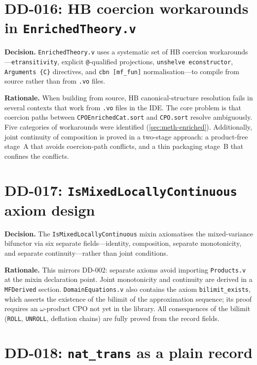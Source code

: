 \section*{DD-016: HB coercion workarounds in \texttt{EnrichedTheory.v}}

\textbf{Decision.}
\texttt{EnrichedTheory.v} uses a systematic set of HB coercion
workarounds---\texttt{etransitivity}, explicit \texttt{@}-qualified
projections, \texttt{unshelve econstructor}, \texttt{Arguments\,\{C\}}
directives, and \texttt{cbn\,[mf\_fun]} normalisation---to compile from
source rather than from \texttt{.vo} files.

\textbf{Rationale.}
When building from source, HB canonical-structure resolution fails in
several contexts that work from \texttt{.vo} files in the IDE.  The core
problem is that coercion paths between \texttt{CPOEnrichedCat.sort} and
\texttt{CPO.sort} resolve ambiguously.  Five categories of workarounds
were identified (\cref{sec:meth-enriched}).  Additionally, joint
continuity of composition is proved in a two-stage approach: a
product-free stage~A that avoids coercion-path conflicts, and a thin
packaging stage~B that confines the conflicts.

\section*{DD-017: \texttt{IsMixedLocallyContinuous} axiom design}

\textbf{Decision.}
The \texttt{IsMixedLocallyContinuous} mixin axiomatises the
mixed-variance bifunctor via six separate fields---identity,
composition, separate monotonicity, and separate continuity---rather
than joint conditions.

\textbf{Rationale.}
This mirrors DD-002: separate axioms avoid importing
\texttt{Products.v} at the mixin declaration point.  Joint monotonicity
and continuity are derived in a \texttt{MFDerived} section.
\texttt{DomainEquations.v} also contains the axiom
\texttt{bilimit\_exists}, which asserts the existence of the bilimit of
the approximation sequence; its proof requires an $\omega$-product CPO
not yet in the library.  All consequences of the bilimit (\texttt{ROLL},
\texttt{UNROLL}, deflation chains) are fully proved from the record
fields.

\section*{DD-018: \texttt{nat\_trans} as a plain record}


